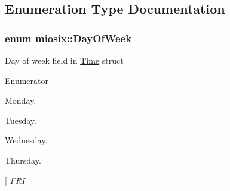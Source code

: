 \subsection{Enumeration Type Documentation}
\hypertarget{group___hardware_ga24027ab4dbf8557211c0a82fb0dffcbf}{
\subsubsection[{Day\-Of\-Week}]{\setlength{\rightskip}{0pt plus 5cm}enum {\bf miosix\-::\-Day\-Of\-Week}}}\label{group___hardware_ga24027ab4dbf8557211c0a82fb0dffcbf}
Day of week field in \hyperlink{structmiosix_1_1_time}{Time} struct \begin{Desc}
\item[Enumerator]\par
\begin{description}
\item[{\em 
\hypertarget{group___hardware_gga24027ab4dbf8557211c0a82fb0dffcbfa962bfb6be11410d30c4406070a19c258}{M\-O\-N}\label{group___hardware_gga24027ab4dbf8557211c0a82fb0dffcbfa962bfb6be11410d30c4406070a19c258}
}]Monday. \item[{\em 
\hypertarget{group___hardware_gga24027ab4dbf8557211c0a82fb0dffcbfac3cdcd22d875a6100df4d9b731017962}{T\-U\-E}\label{group___hardware_gga24027ab4dbf8557211c0a82fb0dffcbfac3cdcd22d875a6100df4d9b731017962}
}]Tuesday. \item[{\em 
\hypertarget{group___hardware_gga24027ab4dbf8557211c0a82fb0dffcbfab74451ba70e3887ee80b2a610e7ba4a6}{W\-E\-D}\label{group___hardware_gga24027ab4dbf8557211c0a82fb0dffcbfab74451ba70e3887ee80b2a610e7ba4a6}
}]Wednesday. \item[{\em 
\hypertarget{group___hardware_gga24027ab4dbf8557211c0a82fb0dffcbfac781efe7eb3004ee537bc9775649873b}{T\-H\-U}\label{group___hardware_gga24027ab4dbf8557211c0a82fb0dffcbfac781efe7eb3004ee537bc9775649873b}
}]Thursday. \item[{\em 
\hypertarget{group___hardware_gga24027ab4dbf8557211c0a82fb0dffcbfabd3c27af7a56a1b8c819ed28e62df294}{F\-R\-I}\label{group___hardware_gga24027ab4dbf8557211c0a82fb0dffcbfabd3c27af7a56a1b8c819ed28e62df294}
}
\end{description}
\end{Desc}
